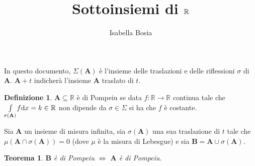 \documentclass[12pt]{article}
\title{Sottoinsiemi \pom{} di $\rea$}%
\author{Isabella Bosia}
\date{}
\newcommand\rea{\mathbb R}
\newcommand\ins[1]{\mathbf #1}
\newcommand\pom{di Pompeiu}
\newcommand\intes[2]{\int\limits_{#1}\!#2\text dx}
\newtheorem{teo}{Teorema}
\theoremstyle{definition}
\newtheorem*{defn}{Definizione}
\begin{document}
\maketitle
In questo documento, $\Sigma(\ins A)$ è l'insieme delle traslazioni e delle riflessioni $\sigma$ di $\ins A$. $\ins A+t$ indicherà l'insieme $\ins A$ traslato di $t$. 
\begin{defn}$\ins A\subseteq\rea$ è \pom{} se data $f:\rea\to\rea$ continua tale che $\intes {\sigma(\ins A)} f=k\in\rea$ non dipende da  $\sigma\in\Sigma$ si ha che $f$ è costante.
\end{defn}

Sia $\ins A$ un insieme di misura infinita, sia $\sigma(\ins A)$ una sua traslazione di $t$ tale che $\mu(\ins A\cap\sigma(\ins A))=0$ (dove $\mu$ è la misura di Lebesgue) e sia $\ins B=\ins A\cup\sigma(\ins A)$.
\begin{teo}\label{teo:B-pom-sse-A-pom}$\ins B$ è \pom{} $\iff$ $\ins A$ è \pom{}.
\end{teo}
\end{document}
